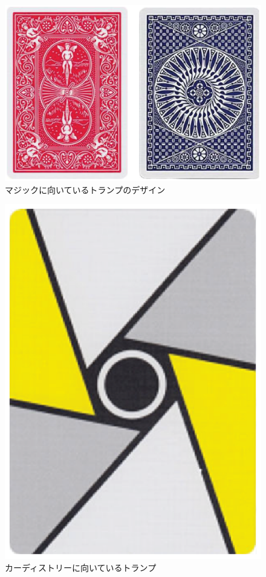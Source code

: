 \begin{figure}[htbp]
    \begin{center}
    \includegraphics[scale=0.6]{image/playing cards.eps}
    \caption{マジックに向いているトランプのデザイン}
    \label{magic_cards}
    \end{center}
\end{figure}

\begin{figure}[htbp]
    \begin{center}
    \includegraphics[scale=0.7]{image/cardstry.eps}
    \caption{カーディストリーに向いているトランプ}
    \label{cardistry_cards}
    \end{center}
\end{figure}

